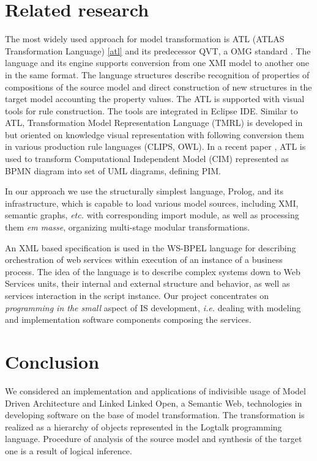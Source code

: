\documentclass[conference,a4paper]{IEEEtran}
\begin{document}
\section{Related research}
\label{sec:rel}

The most widely used approach for model transformation is ATL (ATLAS Transformation Language) \ref{atl} and its predecessor QVT, a OMG standard \cite{QVT}.  The language and its engine supports conversion from one XMI model to another one in the same format.  The language structures describe recognition of properties of compositions of the source model and direct construction of new structures in the target model accounting the property values.  The ATL is supported with visual tools for rule construction.  The tools are integrated in Eclipse IDE.  Similar to ATL, Transformation Model Representation Language (TMRL) is developed in \cite{nikita} but oriented on knowledge visual representation with following conversion them in various production rule languages (CLIPS, OWL).  In a recent paper \cite{azis}, ATL is used to transform Computational Independent Model (CIM) represented as BPMN diagram into set of UML diagrams, defining PIM.

In our approach we use the structurally simplest language, Prolog, and its infrastructure, which is capable to load various model sources, including XMI, semantic graphs, \emph{etc.} with corresponding import module, as well as processing them \emph{em masse}, organizing multi-stage modular transformations.

An XML based specification is used in the WS-BPEL language \cite{wsbpel} for describing orchestration of web services within execution of an instance of a business process.  The idea of the language is to describe complex systems down to Web Services units, their internal and external structure and behavior, as well as services interaction in the script instance.  Our project concentrates on \emph{programming in the small} aspect of IS development, \emph{i.e.} dealing with modeling and implementation software components composing the services.

\section{Conclusion}

We considered an implementation and applications of indivisible usage of Model Driven Architecture and Linked Linked Open, a Semantic Web, technologies in developing software on the base of model transformation.  The transformation is realized as a hierarchy of objects represented in the Logtalk programming language.  Procedure of analysis of the source model and synthesis of the target one is a result of logical inference.
\end{document}
